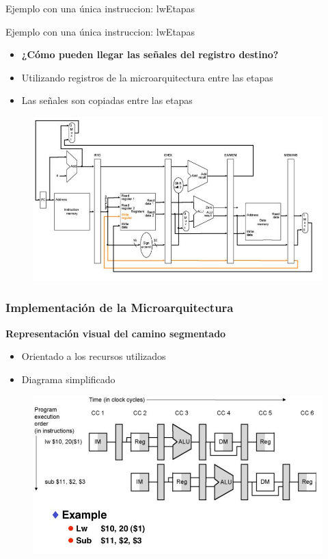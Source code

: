 \documentclass[aspectratio=169,compress]{beamer}
\begin{document}
\begin{footnotesize}
\begin{frame}{Ejemplo con una única instruccion: lw}{Etapas}
\end{frame}





\begin{frame}{Ejemplo con una única instruccion: lw}{Etapas}
\begin{itemize}
\item \textbf{¿Cómo pueden llegar las señales del registro destino?}
\item Utilizando registros de la microarquitectura entre las etapas
\item Las señales son copiadas entre las etapas
\end{itemize}
\begin{figure}
\includegraphics[scale=0.3]{images/sw.jpg} 
\end{figure}

\end{frame}



\begin{frame}
\frametitle{Implementación de la Microarquitectura}
\begin{center}\textbf{Representación visual del camino segmentado}\end{center}
\begin{itemize}
\item Orientado a los recursos utilizados
\item Diagrama simplificado
\end{itemize}
\begin{figure}
\includegraphics[scale=0.3]{images/dosinstrucciones.jpg} 
\end{figure}


\end{frame}
\end{footnotesize}
\end{document}
